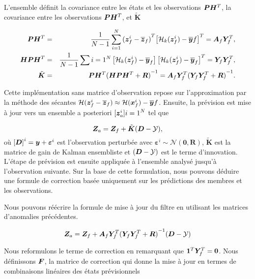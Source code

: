 L'ensemble définit la covariance entre les états et les observations $\bm{P} \bm H^T$, la covariance entre les observations $\bm{P} \bm H^T$, et $\tilde{\bm{K}}$

\begin{eqnarray*}
    \bm{P} \bm H^T &=& \frac{1}{N - 1} \sum_{i = 1}^{N} {(\bm{z}^i_f - \overline{\bm{z}}_f)}^T {\left[ \mathcal{H}_k(\bm{z}^i_f) - \overline{\bm{y}}f\right]}^T = \bm A_f \bm Y_f^T, \\
    \bm H \bm{P} \bm H^T &=& \frac{1}{N -1} \sum{i = 1}^{N}\left[ \mathcal{H}_k(\bm{z}^i_f) - \overline{\bm{y}}_f\right] {\left[ \mathcal{H}_k(\bm{z}^i_f) - \overline{\bm{y}}_f\right]}^T = \bm Y_f \bm Y_f^T,\\
    \tilde{\bm{K}} &=& \bm{P} \bm H^T{(\bm H \bm{P} \bm H^T + \bm R)}^{-1} = \bm A_f \bm Y_f^T {(\bm Y_f \bm Y_f^T + \bm R)}^{-1}.
\end{eqnarray*}

Cette implémentation sans matrice d'observation repose sur l'approximation par la méthode des sécantes $\mathcal{H}(\bm{z}^i_f - \overline{\bm{z}}_f) \approx \mathcal{H} (\bm{x}^i_f) - \overline{\bm{y}}f$.
Ensuite, la prévision est mise à jour vers un ensemble a posteriori ${[\bm{z}^i_a]}{i=1}^{N}$ tel que

\begin{equation} \label{eq:enkf_formula}
    \bm{Z}_a = \bm{Z}_f + \tilde{\bm{K}} ( \bm{D} - \mathcal{Y}),
\end{equation}
où ${[\bm{D}]}^i = \bm{y} + \bm{\varepsilon}^i$ est l'observation perturbée avec $\bm{\varepsilon}^i \sim \mathcal{N}(\bm{0}, \bm R) $, $\tilde{\bm{K}}$ est la matrice de gain de Kalman ensembliste et $( \bm{D} - \mathcal{Y})$ est le terme d'innovation.
L'étape de prévision est ensuite appliquée à l'ensemble analysé jusqu'à l'observation suivante.
Sur la base de cette formulation, nous pouvons déduire une formule de correction basée uniquement sur les prédictions des membres et les observations.

Nous pouvons réécrire la formule de mise à jour du filtre en utilisant les matrices d'anomalies précédentes.

\begin{equation*}
    \bm{Z}_a = \bm{Z}_f + \bm A_f \bm Y_f^T {({\bm Y_f \bm Y_f^T + \bm R})}^{-1}(\bm{D} - \mathcal{Y})
\end{equation*}

Nous reformulons le terme de correction en remarquant que $ \bm{1}^T \bm Y_f^T = \bm{0}$. Nous définissons $\bm{F}$, la matrice de correction qui donne la mise à jour en termes de combinaisons linéaires des états prévisionnels

